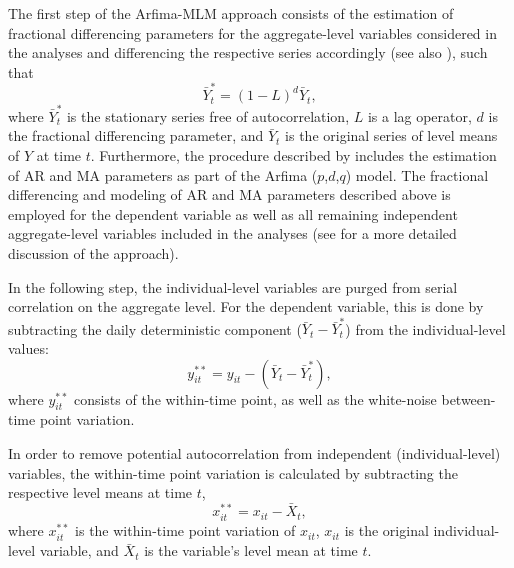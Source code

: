 \documentclass[12pt]{paper}\usepackage[]{graphicx}\usepackage[]{color}
\begin{document}
The first step of the Arfima-MLM approach consists of the estimation of fractional differencing parameters for the aggregate-level variables considered in the analyses and differencing the respective series accordingly (see also \citealt{box1996dynamics}), such that
\begin{equation}
\bar{Y}^*_t=(1-L)^d\bar{Y}_t,
\end{equation}
where $\bar{Y}^*_t$ is the stationary series free of autocorrelation, $L$ is a lag operator, $d$ is the fractional differencing parameter, and $\bar{Y}_t$ is the original series of level means of $Y$ at time $t$. Furthermore, the procedure described by \citet{lebo2015effective} includes the estimation of AR and MA parameters as part of the Arfima ($p$,$d$,$q$) model. The fractional differencing and modeling of AR and MA parameters described above is employed for the dependent variable as well as all remaining independent aggregate-level variables included in the analyses (see \citealt{lebo2015effective} for a more detailed discussion of the approach).

In the following step, the individual-level variables are purged from serial correlation on the aggregate level. For the dependent variable, this is done by subtracting the daily deterministic component ($\bar{Y}_t-\bar{Y}^*_t$) from the individual-level values:
\begin{equation}
y_{it}^{**}=y_{it}-(\bar{Y}_t-\bar{Y}^*_t),\label{eq:ydif}
\end{equation}
where $y_{it}^{**}$ consists of the within-time point, as well as the white-noise between-time point variation.

In order to remove potential autocorrelation from independent (individual-level) variables, the within-time point variation is calculated by subtracting the respective level means at time $t$,
\begin{equation}
x_{it}^{**}=x_{it}-\bar{X}_t,\label{eq:xdif}
\end{equation}
where $x_{it}^{**}$ is the within-time point variation of $x_{it}$, $x_{it}$ is the original individual-level variable, and $\bar{X}_t$ is the variable's level mean at time $t$.
\end{document}
